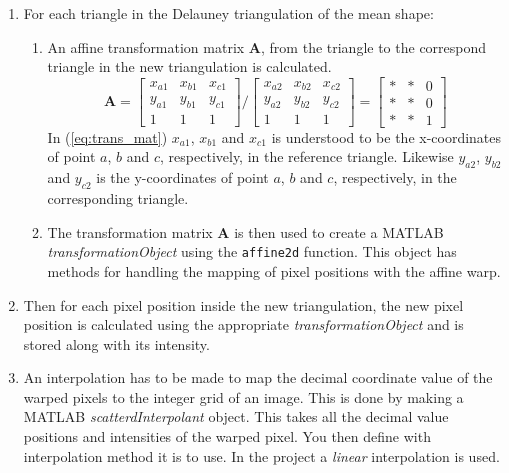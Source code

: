 \documentclass[Main]{subfiles}
\begin{document}
\begin{enumerate}
\begin{enumerate}[label=\Roman*.]
						\item
						For each triangle in the Delauney triangulation of the mean shape:
						\begin{enumerate}[label=\roman*.]
							\item 
							An affine transformation matrix $\textbf{A}$, from the triangle to the correspond triangle in the new triangulation is calculated.
							\begin{equation}
								\label{eq:trans_mat} 
								\textbf{A} = 
								\begin{bmatrix}
									x_{a1} 	& x_{b1}	& x_{c1} \\
									y_{a1}	& y_{b1} 	& y_{c1} \\
									1 		& 1 		& 1
								\end{bmatrix}
								\bigg/
								\begin{bmatrix}
									x_{a2} 	& x_{b2}	& x_{c2} \\
									y_{a2}	& y_{b2} 	& y_{c2} \\
									1 		& 1 		& 1
								\end{bmatrix}
								=
								\begin{bmatrix}
									* & * & 0 \\
									* & * & 0 \\
									* & * & 1
								\end{bmatrix}
							\end{equation}
							In (\ref{eq:trans_mat}) $x_{a1}$, $x_{b1}$ and $x_{c1}$ is understood to be the x-coordinates of point $a$, $b$ and $c$, respectively, in the reference triangle.
							Likewise $y_{a2}$, $y_{b2}$ and $y_{c2}$ is the y-coordinates of point $a$, $b$ and $c$, respectively, in the corresponding triangle.

							\item
							The transformation matrix $\textbf{A}$ is then used to create a MATLAB \emph{transformationObject} using the \texttt{affine2d} function.
							This object has methods for handling the mapping of pixel positions with the affine warp.
						\end{enumerate}

						\item
						Then for each pixel position inside the new triangulation, the new pixel position is calculated using the appropriate \emph{transformationObject} and is stored along with its intensity.

						\item
						An interpolation has to be made to map the decimal coordinate value of the warped pixels to the integer grid of an image.
						This is done by making a MATLAB \emph{scatterdInterpolant} object.
						This takes all the decimal value positions and intensities of the warped pixel.
						You then define with interpolation method it is to use.
						In the project a \emph{linear} interpolation is used.


\end{enumerate}
\end{enumerate}
\end{document}
